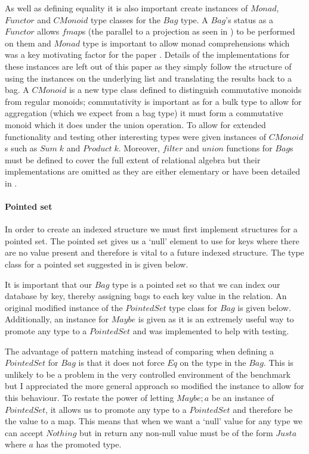 As well as defining equality it is also important create instances of $Monad$,
$Functor$ and $CMonoid$ type classes for the $Bag$ type. A $Bag$'s status as a
$Functor$ allows $fmap$s
(the parallel to a projection as seen in ) to be performed on
them and $Monad$ type is important to allow monad comprehensions which was a key
motivating factor for the paper \relalg{}. Details of the implementations for these instances are
left out of this paper as they simply follow the structure of using the instances on
the underlying list and translating the results back to a bag. A $CMonoid$ is a new type class
defined to distinguish commutative monoids from regular monoids; commutativity
is important as for a bulk type to allow for aggregation (which we expect from a
bag type) it must form a commutative monoid which it does under the union
operation. To allow for extended functionality and testing other interesting
types were given instances of $CMonoid$s such as $Sum\;k$ and $Product\;k$.
Moreover, $filter$
and $union$ functions for $Bag$s must be defined to cover the full extent of
relational algebra but their implementations are omitted as they are either
elementary or have been detailed in \relalg{}.

\paragraph{Pointed set} In order to create an indexed structure we must first
implement structures for a pointed set. The pointed set gives us a `null'
element to use for keys where there are no value present and therefore is vital
to a future indexed structure. The type class for a pointed set suggested in
\relalg{} is given below.



\noindent
It is important that our $Bag$ type is a pointed set so that we can index our
database by key, thereby assigning bags to each key value in the relation. An
original modified instance of the $PointedSet$ type class for $Bag$ is given
below. Additionally, an instance for $Maybe$ is given as it is an extremely
useful way to promote any type to a $PointedSet$ and was implemented to help
with testing.



\noindent
The advantage of pattern matching instead of comparing when defining a
$PointedSet$ for $Bag$ is that it does not force $Eq$ on the type in the $Bag$.
This is unlikely to be a problem in the very controlled environment of the
benchmark but I appreciated the more general approach so modified the instance
to allow for this behaviour. To restate the power of letting $Maybe;a$ be an
instance of $PointedSet$, it allows us to promote any type to a $PointedSet$ and
therefore be the value to a map. This means that when we want a `null' value for
any type we can accept $Nothing$ but in return any non-null value must be of the
form $Just a$ where $a$ has the promoted type.

